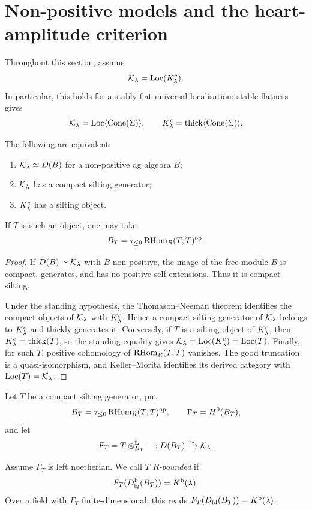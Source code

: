 
\section{Non-positive models and the heart-amplitude criterion}\label{sec:heart-amplitude}

Throughout this section, assume
\[
 \mathcal K_\lambda=\operatorname{Loc}(K^c_\lambda).
\]
In particular, this holds for a stably flat universal localisation: stable flatness gives
\[
 \mathcal K_\lambda=\operatorname{Loc}\langle\operatorname{Cone}(\Sigma)\rangle,
 \qquad
 K^c_\lambda=\operatorname{thick}\langle\operatorname{Cone}(\Sigma)\rangle.
\]

\begin{proposition}\label{prop:nonpositive-model}
The following are equivalent:
\begin{enumerate}[label=(\roman*)]
\item \(\mathcal K_\lambda\simeq D(B)\) for a non-positive dg algebra \(B\);
\item \(\mathcal K_\lambda\) has a compact silting generator;
\item \(K^c_\lambda\) has a silting object.
\end{enumerate}
If \(T\) is such an object, one may take
\[
 B_T=\tau_{\le0}\operatorname{RHom}_R(T,T)^{\mathrm{op}}.
\]
\end{proposition}

\begin{proof}
If \(D(B)\simeq\mathcal K_\lambda\) with \(B\) non-positive, the image of the free module \(B\) is compact, generates, and has no positive self-extensions.  Thus it is compact silting.

Under the standing hypothesis, the Thomason--Neeman theorem identifies the compact objects of \(\mathcal K_\lambda\) with \(K^c_\lambda\).  Hence a compact silting generator of \(\mathcal K_\lambda\) belongs to \(K^c_\lambda\) and thickly generates it.  Conversely, if \(T\) is a silting object of \(K^c_\lambda\), then \(K^c_\lambda=\operatorname{thick}(T)\), so the standing equality gives \(\mathcal K_\lambda=\operatorname{Loc}(K^c_\lambda)=\operatorname{Loc}(T)\).  Finally, for such \(T\), positive cohomology of \(\operatorname{RHom}_R(T,T)\) vanishes.  The good truncation is a quasi-isomorphism, and Keller--Morita identifies its derived category with \(\operatorname{Loc}(T)=\mathcal K_\lambda\).
\end{proof}

Let \(T\) be a compact silting generator, put
\[
 B_T=\tau_{\le0}\operatorname{RHom}_R(T,T)^{\mathrm{op}},
 \qquad
 \Gamma_T=H^0(B_T),
\]
and let
\[
 F_T=T\otimes^{\mathbf L}_{B_T}-:D(B_T)\xrightarrow{\sim}\mathcal K_\lambda.
\]

\begin{definition}\label{def:r-bounded}
Assume \(\Gamma_T\) is left noetherian.  We call \(T\) \emph{\(R\)-bounded} if
\[
 F_T(D^{\mathrm b}_{\mathrm{fg}}(B_T))=K^{\mathrm b}(\lambda).
\]
Over a field with \(\Gamma_T\) finite-dimensional, this reads
\(F_T(D_{\mathrm{fd}}(B_T))=K^{\mathrm b}(\lambda)\).
\end{definition}

